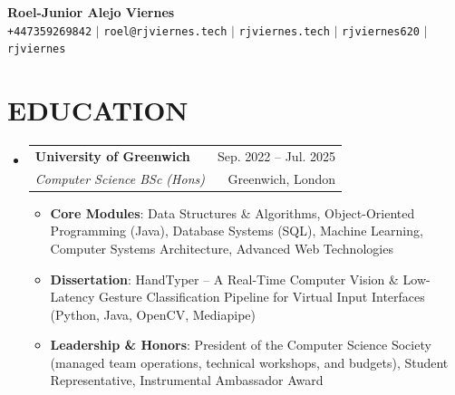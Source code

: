 \documentclass[letterpaper,11pt]{article}
\makeatletter
\newcommand{\resumeItem}[1]{
  \item\footnotesize{
    {#1 \vspace{-1pt}}
  }
}
\newcommand{\resumeSubheading}[4]{
  \vspace{-1pt}\item
    \begin{tabular*}{\textwidth}[t]{l@{\extracolsep{\fill}}r}
      \textbf{#1} & {\color{dark-grey}\small #2}\vspace{1pt}\\ 
      \textit{#3} & {\color{dark-grey} \small #4}\\ 
    \end{tabular*}\vspace{-4pt}
}
\newcommand{\resumeSubHeadingListStart}{\begin{itemize}[leftmargin=0in, label={}]}
\newcommand{\resumeSubHeadingListEnd}{\end{itemize}}
\newcommand{\resumeItemListStart}{\begin{itemize}}
\newcommand{\resumeItemListEnd}{\end{itemize}\vspace{0pt}}
\makeatother
\begin{document}
\begin{center}
    \textbf{\Huge Roel-Junior Alejo Viernes} \\ \vspace{5pt}
    \small \faPhone* \texttt{+447359269842} \hspace{1pt} $|$
    \hspace{1pt} \faEnvelope \hspace{2pt} \texttt{roel@rjviernes.tech} \hspace{1pt} $|$ 
    \hspace{1pt} \faGlobe \hspace{2pt} \texttt{rjviernes.tech} \hspace{1pt} $|$
    \hspace{1pt} \faLinkedin \hspace{2pt}\texttt{rjviernes620} \hspace{1pt} $|$
    \hspace{1pt} \faGithub \hspace{2pt} \texttt{rjviernes}
    \\ \vspace{-3pt}
\end{center}

\section {EDUCATION}
  \resumeSubHeadingListStart
    \resumeSubheading
      {University of Greenwich}{Sep. 2022 -- Jul. 2025}
      {Computer Science BSc (Hons)}{Greenwich, London}
      	\resumeItemListStart
    	\resumeItem {\textbf{Core Modules}: Data Structures \& Algorithms, Object-Oriented Programming (Java), Database Systems (SQL), Machine Learning, Computer Systems Architecture, Advanced Web Technologies}
        \resumeItem 
            {\textbf{Dissertation}: HandTyper -- A Real-Time Computer Vision \& Low-Latency Gesture Classification Pipeline for Virtual Input Interfaces (Python, Java, OpenCV, Mediapipe)}
        \resumeItem {\textbf{Leadership \& Honors}: President of the Computer Science Society (managed team operations, technical workshops, and budgets), Student Representative, Instrumental Ambassador Award}
        \resumeItemListEnd
  \resumeSubHeadingListEnd


\end{document}
